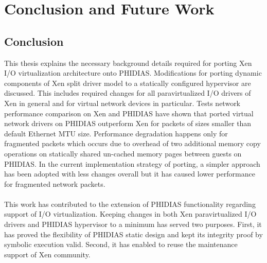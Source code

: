 \chapter{Conclusion and Future Work\label{cha:chapter8}}

\section{Conclusion \label{sec:Conclusion}}
This thesis explains the necessary background details required for porting Xen I/O virtualization architecture onto PHIDIAS. Modifications for porting dynamic components of Xen split driver model to a statically configured hypervisor are discussed. This includes required changes for all paravirtualized I/O drivers of Xen in general and for virtual network devices in particular. Tests network performance comparison on Xen and PHIDIAS have shown that ported virtual network drivers on PHIDIAS outperform Xen for packets of sizes smaller than default Ethernet MTU size. Performance degradation happens only for fragmented packets which occurs due to overhead of two additional memory copy operations on statically shared un-cached memory pages between guests on PHIDIAS. In the current implementation strategy of porting, a simpler approach has been adopted with less changes overall but it has caused lower performance for fragmented network packets.
\\
\\
This work has contributed to the extension of PHIDIAS functionality regarding support of I/O virtualization. 
Keeping changes in both Xen paravirtualized I/O drivers and PHIDIAS hypervisor to a minimum has served two purposes. First, it has proved the flexibility of PHIDIAS static design and kept its integrity proof by symbolic execution valid. Second, it has enabled to reuse the maintenance support of Xen community.

